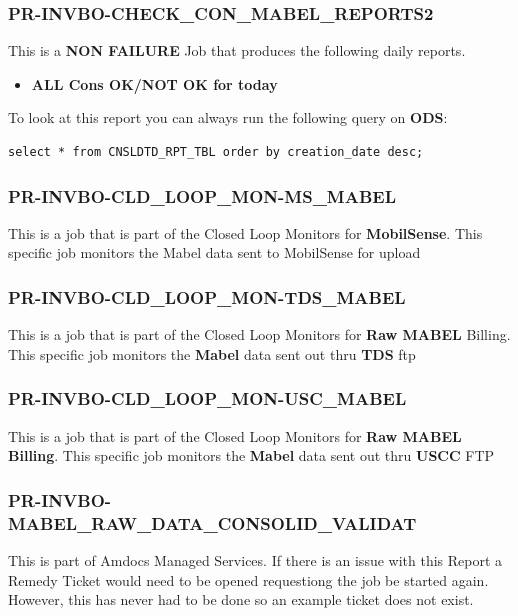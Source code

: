 \documentclass[12pt,twoside]{article}
\begin{document}
\subsubsection{PR-INVBO-CHECK\_CON\_MABEL\_REPORTS2}
\label{sec:orgheadline48}
This is a \textbf{NON FAILURE} Job that produces the following daily reports.
\begin{itemize}
\item \textbf{ALL Cons OK/NOT OK for today}
\end{itemize}
To look at this report you can always run the following query on \textbf{ODS}:
\begin{verbatim}
select * from CNSLDTD_RPT_TBL order by creation_date desc;
\end{verbatim}

\subsubsection{PR-INVBO-CLD\_LOOP\_MON-MS\_MABEL}
\label{sec:orgheadline49}
This is a job that is part of the Closed Loop Monitors for \textbf{MobilSense}.  
This specific job monitors the Mabel data sent to MobilSense for upload

\subsubsection{PR-INVBO-CLD\_LOOP\_MON-TDS\_MABEL}
\label{sec:orgheadline50}
This is a job that is part of the Closed Loop Monitors for \textbf{Raw MABEL} Billing. 
This specific job monitors the \textbf{Mabel} data sent out thru \textbf{TDS} ftp
\subsubsection{PR-INVBO-CLD\_LOOP\_MON-USC\_MABEL}
\label{sec:orgheadline51}
This is a job that is part of the Closed Loop Monitors for \textbf{Raw MABEL Billing}. 
This specific job monitors the \textbf{Mabel} data sent out thru \textbf{USCC} FTP

\subsubsection{PR-INVBO-MABEL\_RAW\_DATA\_CONSOLID\_VALIDAT}
\label{sec:orgheadline52}
This is part of Amdocs Managed Services. If there is an issue with this Report a Remedy Ticket would need to be opened requestiong the job be started again. 
However, this has never had to be done so an example ticket does not exist. 
\end{document}
